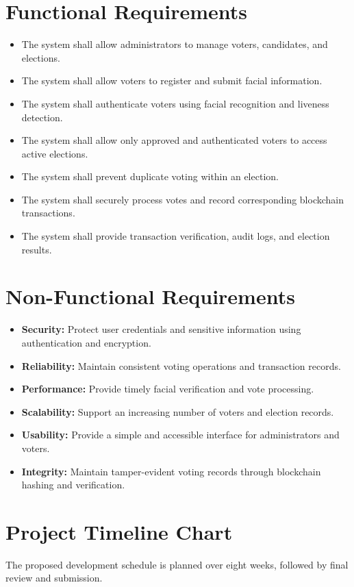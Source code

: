 \documentclass[12pt]{report}
\begin{document}
	\newpage
	\section{Functional Requirements}
	\begin{itemize}
		\item The system shall allow administrators to manage voters, candidates, and elections.
		\item The system shall allow voters to register and submit facial information.
		\item The system shall authenticate voters using facial recognition and liveness detection.
		\item The system shall allow only approved and authenticated voters to access active elections.
		\item The system shall prevent duplicate voting within an election.
		\item The system shall securely process votes and record corresponding blockchain transactions.
		\item The system shall provide transaction verification, audit logs, and election results.
	\end{itemize}
	
	\section{Non-Functional Requirements}
	\begin{itemize}
		\item \textbf{Security:} Protect user credentials and sensitive information using authentication and encryption.
		\item \textbf{Reliability:} Maintain consistent voting operations and transaction records.
		\item \textbf{Performance:} Provide timely facial verification and vote processing.
		\item \textbf{Scalability:} Support an increasing number of voters and election records.
		\item \textbf{Usability:} Provide a simple and accessible interface for administrators and voters.
		\item \textbf{Integrity:} Maintain tamper-evident voting records through blockchain hashing and verification.
	\end{itemize}
	
	\section{Project Timeline Chart}
	The proposed development schedule is planned over eight weeks, followed by final review and submission.
	
\end{document}
